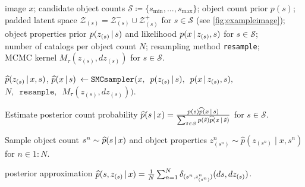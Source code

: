 \documentclass[
  12pt]{article}
\newcommand{\algorithmspace}{\vspace{3pt}}
\newcommand{\padvert}{\thinspace \vert \thinspace}
\begin{document}
\begin{algorithm}[t]
\small
\caption{Count-stratified sequential Monte Carlo (\texttt{CS-SMC})} \label{algorithm:cs-smc}
\begin{algorithmic}
\Require image $x$; candidate object counts $\mathcal{S} \coloneqq \{s_{\min}, ..., s_{\max}\}$; object count prior $p(s)$; \\
\qquad\quad padded latent space $\mathcal{Z}_{(s)} = \mathcal{Z}_{(s)}^- \cup \mathcal{Z}_{(s)}^+$ for $s \in \mathcal{S}$ (see \autoref{fig:exampleimage}); \\
\qquad\quad object properties prior $p(z_{(s)} \padvert s)$ and likelihood $p(x \padvert z_{(s)}, s)$ for $s \in \mathcal{S}$; \\
\qquad\quad number of catalogs per object count $N$; resampling method \texttt{resample}; \\
\qquad\quad MCMC kernel $M_\tau(z_{(s)}, dz_{(s)})$ for $s \in \mathcal{S}$.

\algorithmspace
\algorithmspace


\State $\widehat{p}(z_{(s)} \padvert x, s)$, \enspace $\widehat{p}(x \padvert s)$ \thinspace $\leftarrow \texttt{SMCsampler}(x, \enspace p(z_{(s)} \padvert s), \enspace p(x \padvert z_{(s)}, s),$ \\
\hspace{170pt}$N, \enspace \texttt{resample}, \enspace M_\tau(z_{(s)}, dz_{(s)}))$.
\EndFor

\algorithmspace
\algorithmspace

\State Estimate posterior count probability $\widehat{p}(s \padvert x) = \frac{p(s) \widehat{p}(x \padvert s)}{\sum_{\tilde{s} \in \mathcal{S}} p(\tilde{s}) \widehat{p}(x \padvert \tilde{s})}$ for $s \in \mathcal{S}$.

\algorithmspace
\algorithmspace

\State Sample object count $s^n \sim \widehat{p}(s \padvert x)$ and object properties $z_{(s^n)}^n \sim \widehat{p}(z_{(s^n)} \mid x, s^n)$ for $n \in 1{:}N$.

\algorithmspace
\algorithmspace

\Ensure posterior approximation $\widehat{p}(s, z_{(s)} \padvert x) = \frac{1}{N} \sum_{n=1}^N \delta_{(s^n, z_{(s^n)}^n)} (ds, dz_{(s)})$.
\end{algorithmic}
\end{algorithm}
\end{document}
